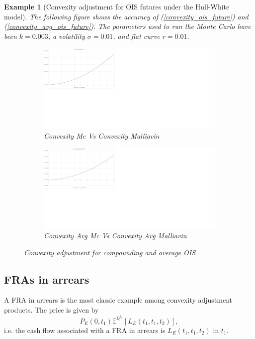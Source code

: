 \documentclass[a4paper,10pt]{article}
\newtheorem{example}[theorem]{Example}
\newcommand{\1}{\mathbf{1}}
\begin{document}
\begin{example}[Convexity adjustment for OIS futures under the Hull-White model]
The following figure shows the accuracy of (\ref{convexity_ois_future}) and (\ref{convexity_avg_ois_future}). The parameters used to run the Monte Carlo have been $k=0.003$, a volatility $\sigma=0.01$, and flat curve $r=0.01$. 
\begin{figure}[H]
\begin{subfigure}{.5\textwidth}
  \centering
  \includegraphics[scale=0.2]{Figures/convexity_ois.jpg}
		\caption{Convexity Mc Vs Convexity Malliavin}
\end{subfigure}
\begin{subfigure}{.5\textwidth}
  \centering
  \includegraphics[scale=0.2]{Figures/convexity_avg_ois.jpg}
		\caption{Convexity Avg Mc Vs Convexity Avg Malliavin}
\end{subfigure}
\caption{Convexity adjustment for compounding and average OIS}
\end{figure} 
\end{example}



\subsection{FRAs in arrears}
A FRA in arrears is the most classic example among convexity adjustment products. The price is given by
\begin{equation}\label{FRAinArrear}
P_{E}(0,t_1)\mathbb{E}^{\mathbb{Q}^{t_1}}\left[L_{E}(t_1,t_1,t_2)\right],
\end{equation}
i.e. the cash flow associated with a FRA in arrears is $L_{E}(t_1,t_1,t_2)$ in $t_1$.
\end{document}
